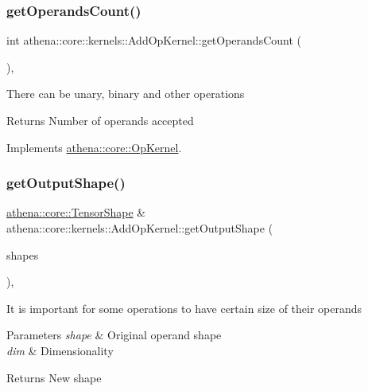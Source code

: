 \subsubsection{\texorpdfstring{get\+Operands\+Count()}{getOperandsCount()}}
{\footnotesize\ttfamily int athena\+::core\+::kernels\+::\+Add\+Op\+Kernel\+::get\+Operands\+Count (\begin{DoxyParamCaption}{ }\end{DoxyParamCaption})\hspace{0.3cm}{\ttfamily [override]}, {\ttfamily [virtual]}}

There can be unary, binary and other operations \begin{DoxyReturn}{Returns}
Number of operands accepted 
\end{DoxyReturn}


Implements \mbox{\hyperlink{classathena_1_1core_1_1_op_kernel_add97d4c132d80ecd9915acfedf7c9119}{athena\+::core\+::\+Op\+Kernel}}.

\mbox{\label{classathena_1_1core_1_1kernels_1_1_add_op_kernel_aaf21b2b72c6e601964e53eb6de7fccfd}} 
\subsubsection{\texorpdfstring{get\+Output\+Shape()}{getOutputShape()}}
{\footnotesize\ttfamily \mbox{\hyperlink{classathena_1_1core_1_1_tensor_shape}{athena\+::core\+::\+Tensor\+Shape}} \& athena\+::core\+::kernels\+::\+Add\+Op\+Kernel\+::get\+Output\+Shape (\begin{DoxyParamCaption}\item[{const std\+::vector$<$ \mbox{\hyperlink{classathena_1_1core_1_1_tensor_shape}{athena\+::core\+::\+Tensor\+Shape}} \& $>$ \&}]{shapes }\end{DoxyParamCaption})\hspace{0.3cm}{\ttfamily [override]}, {\ttfamily [virtual]}}

It is important for some operations to have certain size of their operands 
\begin{DoxyParams}{Parameters}
{\em shape} & Original operand shape \\
\hline
{\em dim} & Dimensionality \\
\hline
\end{DoxyParams}
\begin{DoxyReturn}{Returns}
New shape 
\end{DoxyReturn}


